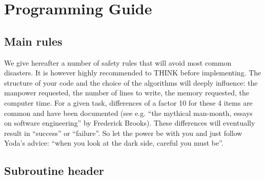 \chapter{\telemacsystem Programming Guide}
\label{codingconv}

\section{Main rules}

We give hereafter a number of safety rules that will avoid most common
disasters. It is however highly recommended to THINK before implementing. The
structure of your code and the choice of the algorithms will deeply influence:
the manpower requested, the number of lines to write, the memory requested, the
computer time. For a given task, differences of a factor 10 for these 4 items
are common and have been documented (see e.g. “the mythical man-month, essays
on software engineering” by Frederick Brooks). These differences will
eventually result in “success” or “failure”. So let the power be with you and
just follow Yoda’s advice: “when you look at the dark side, careful you must
be”.

\section{Subroutine header}

